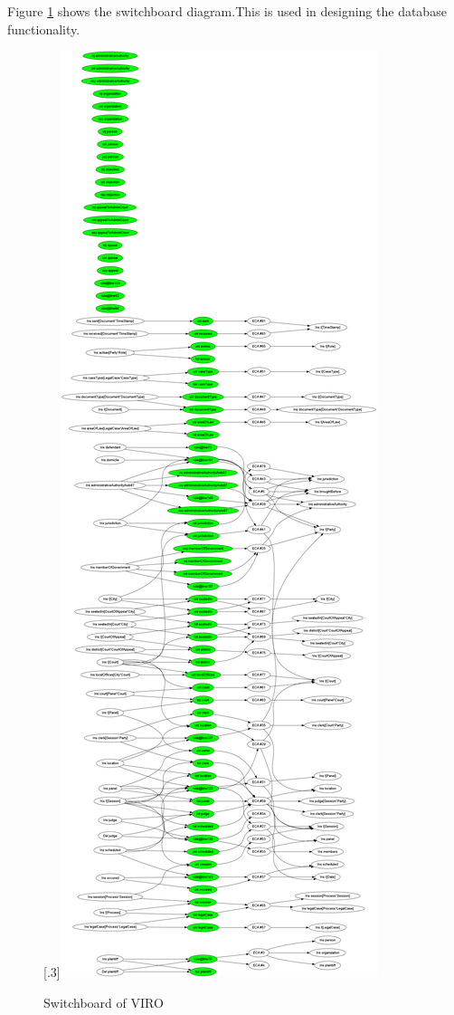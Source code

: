 \documentclass[10pt,a4paper]{report}              %
\theoremstyle{plain}\theorembodyfont{\rmfamily}\newtheorem{definition}{Definition}[section]
\theoremstyle{plain}\theorembodyfont{\rmfamily}\newtheorem{designrule}[definition]{Requirement}
\begin{document}
Figure \ref{fig:SBVIRO} shows the switchboard diagram.This is used in designing the database functionality.

\begin{figure}[htb]
\begin{center}
\scalebox{.3}[.3]{\includegraphics{SBVIRO}}
\caption{Switchboard of VIRO}
\label{fig:SBVIRO}
\end{center}
\end{figure}
\end{document}
